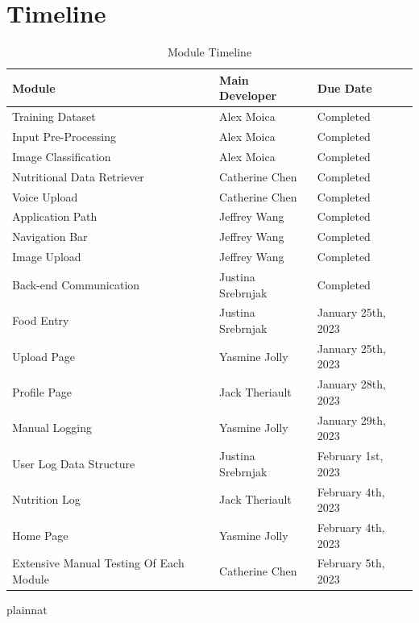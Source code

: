 \documentclass[12pt, titlepage]{article}
\begin{document}
\section{Timeline}


\begin{table}[H] 
	\begin{tabularx}{\textwidth}{|X|X|X|}
		\hline
		\textbf{Module} & \textbf{Main Developer} & \textbf{Due Date}\\
		\hline
		Training Dataset & Alex Moica & 
		Completed \\
		\hline
		Input Pre-Processing & Alex Moica & 
		Completed \\
		\hline
		Image Classification & Alex Moica & 
		Completed \\
		\hline
		Nutritional Data Retriever & Catherine Chen & 
		Completed \\
		\hline
		Voice Upload  & Catherine Chen & 
		Completed \\
		\hline
		Application Path & Jeffrey Wang & 
		Completed \\
		\hline
		Navigation Bar & Jeffrey Wang & 
		Completed \\
		\hline
		Image Upload  & Jeffrey Wang & 
		Completed \\
		\hline
		Back-end Communication & Justina Srebrnjak & 
		Completed \\
		\hline
		Food Entry & Justina Srebrnjak & 
		January 25th, 2023 \\
		\hline
		Upload Page & Yasmine Jolly & 
		January 25th, 2023 \\
		\hline
		Profile Page & Jack Theriault & 
		January 28th, 2023 \\
		\hline
		Manual Logging  & Yasmine Jolly & 
		January 29th, 2023 \\
		\hline
		User Log Data Structure & Justina Srebrnjak & 
		February 1st, 2023 \\
		\hline
		Nutrition Log & Jack Theriault & 
		February 4th, 2023 \\
		\hline
		Home Page & Yasmine Jolly & 
		February 4th, 2023 \\
		\hline
		Extensive Manual Testing Of Each Module & Catherine Chen & 
		February 5th, 2023 \\
		\hline
	\end{tabularx}
	\caption{Module Timeline}
\end{table}

 {plainnat}

\end{document}
